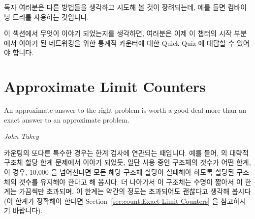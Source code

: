 {{	독자 여러분은 다른 방법들을 생각하고 시도해 볼 것이 장려되는데, 예를
	들면 컴바이닝 트리를 사용하는 것입니다.

}\QuickQuizEndE
}

이 섹션에서 무엇이 이야기 되었는지를 생각하면, 여러분은 이제 이 챕터의 시작
부분에서 이야기 된 네트워킹을 위한 통계적 카운터에 대한 Quick Quiz 에 대답할 수
있어야 합니다.

\section{Approximate Limit Counters}
\label{sec:count:Approximate Limit Counters}
%
\epigraph{An approximate answer to the right problem is worth a good deal
	  more than an exact answer to an approximate problem.}
	 {\emph{John Tukey}}

카운팅의 또다른 특수한 경우는 한계 검사에 연관되는 때입니다.
예를 들어, \QuickQuizRef{\QcountQapproxcnt} 의 대략적 구조체 할당 한계 문제에서
이야기 되었듯, 일단 사용 중인 구조체의 갯수가 어떤 한계, 이 경우, 10,000 을
넘어선다면 모든 해당 구조체 할당이 실패해야 하도록 할당된 구조체의 갯수를
유지해야 한다고 해 봅시다.
더 나아가서 이 구조체는 수명이 짧아서 이 한계는 가끔씩만 초과되며, 이 한계는
약간의 정도는 초과되어도 괜찮다고 생각해 봅시다 (이 한계가 정확해야 한다면
Section~\ref{sec:count:Exact Limit Counters} 을 참고하시기 바랍니다).

